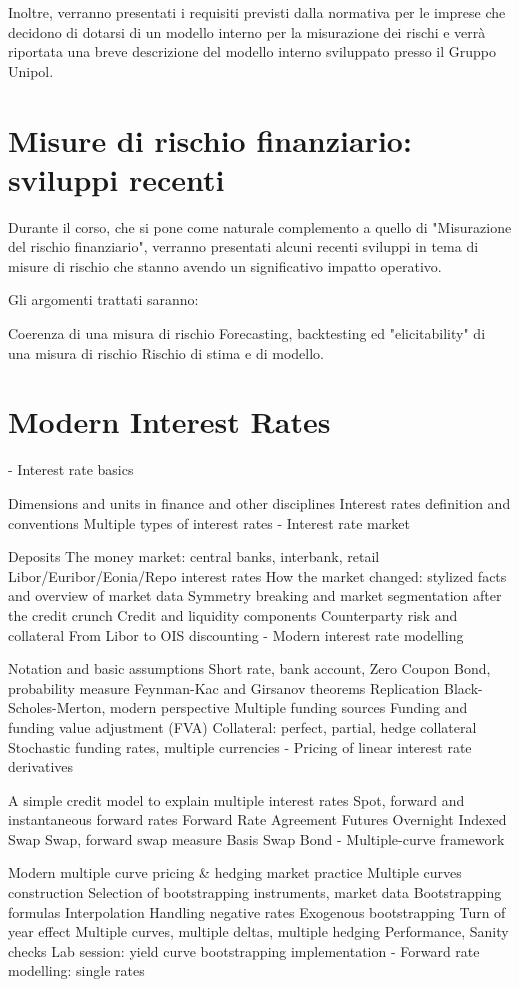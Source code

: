 Inoltre, verranno presentati i requisiti previsti dalla normativa per le imprese che decidono di dotarsi di un modello interno per la misurazione dei rischi e verrà riportata una breve descrizione del modello interno sviluppato presso il Gruppo Unipol.


\section{Misure di rischio finanziario: sviluppi recenti}
Durante il corso, che si pone come naturale complemento a quello di "Misurazione del rischio finanziario", verranno presentati alcuni recenti sviluppi in tema di misure di rischio che stanno avendo un significativo impatto operativo.

Gli argomenti trattati saranno:

Coerenza di una misura di rischio
Forecasting, backtesting ed "elicitability" di una misura di rischio
Rischio di stima e di modello.


\section{Modern Interest Rates}
- Interest rate basics

Dimensions and units in finance and other disciplines
Interest rates definition and conventions
Multiple types of interest rates
- Interest rate market

Deposits
The money market: central banks, interbank, retail
Libor/Euribor/Eonia/Repo interest rates
How the market changed: stylized facts and overview of market data
Symmetry breaking and market segmentation after the credit crunch
Credit and liquidity components
Counterparty risk and collateral
From Libor to OIS discounting
- Modern interest rate modelling

Notation and basic assumptions
Short rate, bank account, Zero Coupon Bond, probability measure
Feynman-Kac and Girsanov theorems
Replication
Black-Scholes-Merton, modern perspective
Multiple funding sources
Funding and funding value adjustment (FVA)
Collateral: perfect, partial, hedge collateral
Stochastic funding rates, multiple currencies
- Pricing of linear interest rate derivatives

A simple credit model to explain multiple interest rates
Spot, forward and instantaneous forward rates
Forward Rate Agreement
Futures
Overnight Indexed Swap
Swap, forward swap measure
Basis Swap
Bond
- Multiple-curve framework

Modern multiple curve pricing \& hedging market practice
Multiple curves construction
Selection of bootstrapping instruments, market data
Bootstrapping formulas
Interpolation
Handling negative rates
Exogenous bootstrapping
Turn of year effect
Multiple curves, multiple deltas, multiple hedging
Performance, Sanity checks
Lab session: yield curve bootstrapping implementation
- Forward rate modelling: single rates

